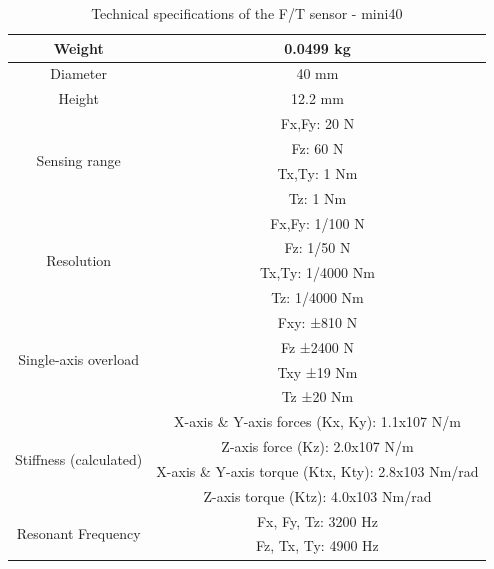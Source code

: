 \begin{table}[htbp]
\centering
\caption{Technical specifications of the F/T sensor - mini40}
\label{tab:mini40_specification}
\par
\begin{tabular}{|c|c|} 
\hline
Weight										&0.0499 kg	\\  \hline
Diameter									&40 mm  	\\ 	\hline
Height										&12.2 mm 	\\	\hline
\multirow{4}{*}{Sensing range}					&Fx,Fy: 20 N\\
											&Fz: 60 N\\
											&Tx,Ty: 1 Nm\\	
											&Tz: 1 Nm\\	\hline
\multirow{4}{*}{Resolution}						&Fx,Fy: 1/100 N	\\
											&Fz: 1/50 N\\
											&Tx,Ty: 1/4000 Nm\\	
											&Tz: 1/4000 Nm\\	\hline										
\multirow{4}{*}{Single-axis overload} 			&Fxy: ±810 N  \\	
											&Fz	±2400 N  \\
											&Txy	±19 Nm  \\
											&Tz	±20 Nm  \\ \hline
\multirow{4}{*}{Stiffness (calculated)}   		&X-axis \& Y-axis forces (Kx, Ky): 1.1x107 N/m   \\	
											&Z-axis force (Kz): 2.0x107 N/m   \\	
											&X-axis \& Y-axis torque (Ktx, Kty): 2.8x103 Nm/rad   \\	
											&Z-axis torque (Ktz): 4.0x103 Nm/rad   \\	 \hline
\multirow{2}{*}{Resonant Frequency} 			&Fx, Fy, Tz: 3200 Hz  \\
											&Fz, Tx, Ty: 4900 Hz  \\
\hline
\end{tabular}
\end{table}

\newpage
